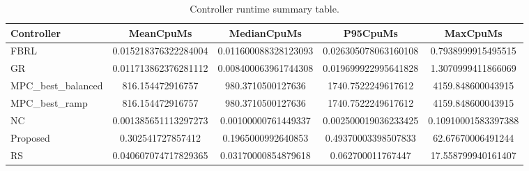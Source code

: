 \begin{table}[t]
\centering
\caption{Controller runtime summary table.}
\label{tab:runtime_auto}
\begin{tabular}{lcccc}
\toprule
Controller & MeanCpuMs & MedianCpuMs & P95CpuMs & MaxCpuMs \\
\midrule
FBRL & 0.015218376322284004 & 0.011600088328123093 & 0.026305078063160108 & 0.7938999915495515 \\
GR & 0.011713862376281112 & 0.008400063961744308 & 0.019699922995641828 & 1.3070999411866069 \\
MPC\_best\_balanced & 816.154472916757 & 980.3710500127636 & 1740.7522249617612 & 4159.848600043915 \\
MPC\_best\_ramp & 816.154472916757 & 980.3710500127636 & 1740.7522249617612 & 4159.848600043915 \\
NC & 0.001385651113297273 & 0.00100000761449337 & 0.002500019036233425 & 0.10910001583397388 \\
Proposed & 0.302541727857412 & 0.1965000992640853 & 0.49370003398507833 & 62.67670006491244 \\
RS & 0.040607074717829365 & 0.03170000854879618 & 0.062700011767447 & 17.558799940161407 \\
\bottomrule
\end{tabular}
\end{table}